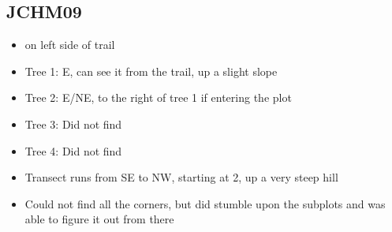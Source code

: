 \documentclass{article}\usepackage[]{graphicx}\usepackage[]{color}
\begin{document}
\subsection{JCHM09}
\begin{itemize}
\item on left side of trail
\item Tree 1: E, can see it from the trail, up a slight slope
\item Tree 2: E/NE, to the right of tree 1 if entering the plot
\item Tree 3: Did not find
\item Tree 4: Did not find
\item Transect runs from SE to NW, starting at 2, up a very steep hill
\item Could not find all the corners, but did stumble upon the subplots and was able to figure it out from there
\end{itemize}
\end{document}
